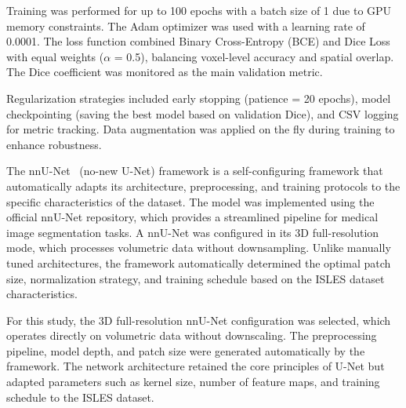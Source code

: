 \documentclass[12pt]{article}
\begin{document}
Training was performed for up to 100 epochs with a batch size of 1 due to GPU memory constraints. The Adam optimizer was used with a learning rate of 0.0001. The loss function combined Binary Cross-Entropy (BCE) and Dice Loss with equal weights ($\alpha$ = 0.5), balancing voxel-level accuracy and spatial overlap. The Dice coefficient was monitored as the main validation metric.

Regularization strategies included early stopping (patience = 20 epochs), model checkpointing (saving the best model based on validation Dice), and CSV logging for metric tracking. Data augmentation was applied on the fly during training to enhance robustness.


The nnU-Net~\cite{Isensee2021} (no-new U-Net) framework is a self-configuring framework that automatically adapts its architecture, preprocessing, and training protocols to the specific characteristics of the dataset. The model was implemented using the official nnU-Net repository, which provides a streamlined pipeline for medical image segmentation tasks. A nnU-Net   was configured in its 3D full-resolution mode, which processes volumetric data without downsampling. Unlike manually tuned architectures, the framework automatically determined the optimal patch size, normalization strategy, and training schedule based on the ISLES dataset characteristics.

For this study, the 3D full-resolution nnU-Net configuration was selected, which operates directly on volumetric data without downscaling. The preprocessing pipeline, model depth, and patch size were generated automatically by the framework. The network architecture retained the core principles of U-Net but adapted parameters such as kernel size, number of feature maps, and training schedule to the ISLES dataset.
\end{document}
